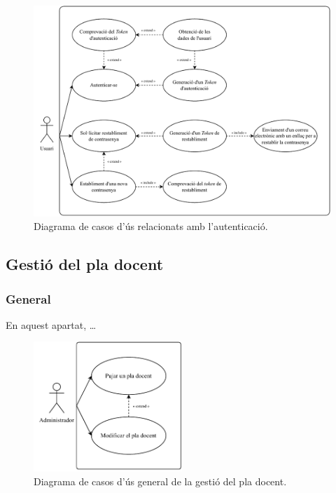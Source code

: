 \documentclass[a4paper,12pt]{ThesisStyle}
\begin{document}
\begin{figure}[H]
  \centering
  \includegraphics[width=\textwidth]{assets/use_cases/auth.pdf}
  \caption{\label{img:casos_us_auth}Diagrama de casos d'ús relacionats amb l'autenticació.}
\end{figure}

\subsection{Gestió del pla docent}
\label{subsec:casos_us_pla}

\subsubsection{General}

En aquest apartat, \dots

\begin{figure}[H]
  \centering
  \includegraphics[width=0.5\textwidth]{assets/use_cases/pla_docent/general.pdf}
  \caption{\label{img:casos_us_pla_general}Diagrama de casos d'ús general de la gestió del pla docent.}
\end{figure}
\end{document}
